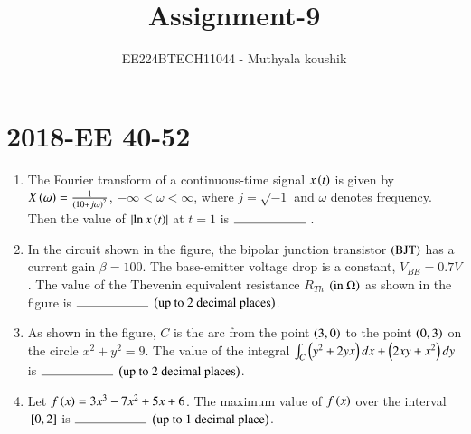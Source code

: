\documentclass[journal,12pt,onecolumn]{IEEEtran}
\theoremstyle{remark}
\begin{document}

\vspace{3cm}

\title{Assignment-9}
\author{EE224BTECH11044 - Muthyala koushik
}
\maketitle
\bigskip

\renewcommand{\thefigure}{\theenumi}
\renewcommand{\thetable}{\theenumi}

\section{2018-EE 40-52}
\begin{enumerate}[start=40]
	\item The Fourier transform of a continuous-time signal $x\left(t\right)$ is given by $X\left(\omega\right)=\frac{1}{\left(10+j\omega\right)^2}$, $-\infty<\omega<\infty$, where $j=\sqrt{-1}$ and $\omega$ denotes frequency. Then the value of $\left\vert\ln{x\ensuremath{\left(t\right)}}\right\vert$ at $t=1$ is $\rule{2cm}{0.4pt}$ . \\

	\item In the circuit shown in the figure, the bipolar junction transistor $\left(\text{BJT}\right)$ has a current gain $\beta = 100$. The base-emitter voltage drop is a constant, $V_{BE} = 0.7 V$. The value of the Thevenin equivalent resistance $R_{Th}$ $\left(\text{in \ohm}\right)$ as shown in the figure is $\rule{2cm}{0.4pt}$ $\left(\text{up to 2 decimal places}\right)$.\\
\begin{figure}[H]
    \centering
\end{figure}
		

	\item As shown in the figure, $C$ is the arc from the point $\left(3,0\right)$ to the point $\left(0,3\right)$ on the circle $x^2 + y^2 = 9$. The value of the integral $\int_{C} \left(y^2+2yx\right)dx + \left(2xy+x^2\right)dy$ is $\rule{2cm}{0.4pt}$ $\left(\text{up to 2 decimal places}\right)$.\\
\begin{figure}[H]
    \centering
\end{figure}
		

	\item Let $f\left(x\right)=3x^3-7x^2+5x+6$. The maximum value of $f\left(x\right)$ over the interval ${}\left[0, 2\right]$ is $\rule{2cm}{0.4pt}$ $\left(\text{up to 1 decimal place}\right)$.\\


\end{enumerate}
\end{document}
